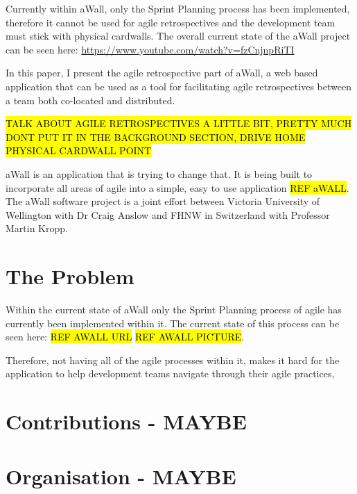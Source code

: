 Currently within aWall, only the Sprint Planning process has been implemented, therefore it cannot be used for agile retrospectives and the development team must stick with physical cardwalls. The overall current state of the aWall project can be seen here: \url{https://www.youtube.com/watch?v=fzCnjnpRiTI}

In this paper, I present the agile retrospective part of aWall, a web based application that can be used as a tool for facilitating agile retrospectives between a team both co-located and distributed. 



\hl{TALK ABOUT AGILE RETROSPECTIVES A LITTLE BIT, PRETTY MUCH DONT PUT IT IN THE BACKGROUND SECTION, DRIVE HOME PHYSICAL CARDWALL POINT}

aWall is an application that is trying to change that. It is being built to incorporate all areas of agile into a simple, easy to use application \hl{REF aWALL}. The aWall software project is a joint effort between Victoria University of Wellington with Dr Craig Anslow and FHNW in Switzerland with Professor Martin Kropp. 
\section{The Problem}
Within the current state of aWall only the Sprint Planning process of agile has currently been implemented within it. The current state of this process can be seen here: \hl{REF AWALL URL} \hl{REF AWALL PICTURE}. 

Therefore, not having all of the agile processes within it, makes it hard for the application to help development teams navigate through their agile practices, 
\section{Contributions - MAYBE}
\section{Organisation - MAYBE}
